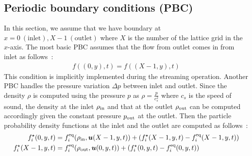 \subsection{Periodic boundary conditions (PBC)}
In this section, we assume that we have
boundary at $x = 0~(\text{inlet}), X - 1~(\text{outlet})$
where $X$ is the number of the lattice grid in the $x$-axis.
The most basic PBC assumes that
the flow from outlet comes in from inlet as follows~\cite{succi2018lattice}: 
\begin{equation}
\begin{aligned}
  f((0, y), t) = f((X - 1, y), t)
\end{aligned}
\end{equation}
This condition is implicitly implemented during the streaming operation.
Another PBC handles
the pressure variation $\Delta p$ between inlet and outlet.
Since the density $\rho$ is computed using the pressure $p$
as $\rho = \frac{p}{c_s^2}$ where $c_s$ is the speed of sound,
the density at the inlet $\rho_{\rm in}$ and
that at the outlet $\rho_{\rm out}$ can be computed
accordingly given the constant pressure $p_{\rm out}$
at the outlet.
Then the particle probability density functions at 
the inlet and the outlet are computed as follows~\cite{succi2018lattice}:
\begin{equation}
\begin{aligned}
  f_i^\star(0, y, t) &=
  f_i^{\rm eq}(\rho_{\rm in}, \boldsymbol{u}(X - 1, y, t))
  + (f_i^\star(X - 1, y, t) - f_i^{\rm eq}(X - 1, y, t))\\
  f_i^\star(X - 1, y, t) &=
  f_i^{\rm eq}(\rho_{\rm out}, \boldsymbol{u}(0, y, t))
  + (f_i^\star(0, y, t) - f_i^{\rm eq}(0, y, t))\\
\end{aligned}
\label{discretized-pbc-pressure}
\end{equation}
